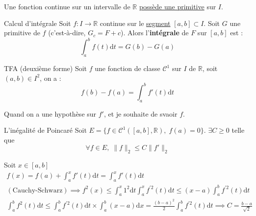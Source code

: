 \begin{Corollary}{}{}
Une fonction continue sur un intervalle de $\mathbb{R}$ \underline{possède une primitive} sur $I$.
\end{Corollary}

\begin{Corollary}{Calcul d'intégrale}{}
  Soit $f : I \to \mathbb{R}$ continue sur le \underline{segment} $[a,b] \subset I$. Soit $G$ une primitive de $f$ (c'est-à-dire, $G_c = F + c$). Alors  l'\textbf{intégrale} de $F$ sur $[a,b]$ est :
  \begin{equation}
    \int_{a}^{b} f(t) \mathrm{d} t = G(b) - G(a)
  \end{equation}
\end{Corollary}

\begin{Theorem}{\color{red} TFA (deuxième forme)}{}
Soit $f$ une fonction de classe $\mathcal{C} ^{1}$ sur $I$ de $\mathbb{R}$, soit $(a,b) \in I ^{2}$, on a :
\begin{equation}
  f(b) - f(a) = \int_{a}^{b} f'(t) \mathrm{d} t
\end{equation}
\end{Theorem}

\begin{note}{}{}
  Quand on a une hypothèse sur $f'$, et je souhaite de svaoir $f$.
\end{note}


\begin{Example}{L'inégalité de Poincaré}{}
  Soit $E = \{ f \in \mathcal{C} ^{1}([a,b], \mathbb{R}), \; f(a) = 0\}$. $\exists C \ge 0$ telle que 
  \begin{equation}
    \forall f \in E, \; \| f \| _{2} \le C \| f' \|_2
  \end{equation}

\end{Example}

\begin{myproof}{}{} Soit $x \in [a,b]$
\begin{gather}
  f(x) = f(a) + \int_{a}^{x} f'(t) \mathrm{d} t = \int_{a}^{x} f'(t) \mathrm{d}t \\ 
  (\text{Cauchy-Schwarz})\implies f ^{2}(x) \le \int_{a}^{x} 1 ^{2} \mathrm{d} t \int_{a}^{x} f^{'2}(t) \mathrm{d} t \le (x-a) \int_{a}^{b} f ^{'2}(t) \mathrm{d} t \\ 
  \int_{a}^{b} f ^{2}(t)  \mathrm{d} t \le \int_{a}^{b}f ^{'2}(t) \mathrm{d}t \times \int_{a}^{b}(x-a) \mathrm{d}x  = \frac{(b-a) ^{2}}{2}  \int_{a}^{b} f ^{'2}(t) \mathrm{d} t \implies C = \frac{b-a}{\sqrt{2}} 
\end{gather} 
\end{myproof}


